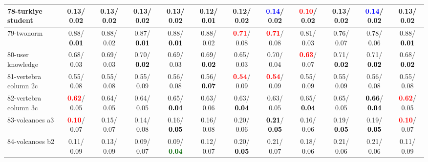 \begin{table}[h]
\begin{center}
{\begin{tabular}{lc|c|c|c|c|c|c|c|c|c|c}
78-turkiye student &   0.13/  0.02 &   0.13/  0.02 &   0.13/  0.02 &   0.13/  0.02 &   0.12/\textcolor{black}{\textbf{  0.01}} &   0.12/  0.02 & \textcolor{blue}{\textbf{  0.14}}/  0.02 & \textcolor{red}{\textbf{  0.10}}/  0.02 &   0.13/  0.02 & \textcolor{blue}{\textbf{  0.14}}/  0.02 &   0.13/  0.02 \\ \hline
79-twonorm &   0.88/\textcolor{black}{\textbf{  0.01}} &   0.88/  0.02 &   0.87/\textcolor{black}{\textbf{  0.01}} &   0.88/\textcolor{black}{\textbf{  0.01}} &   0.88/  0.02 & \textcolor{red}{\textbf{  0.71}}/  0.08 & \textcolor{red}{\textbf{  0.71}}/  0.08 &   0.81/  0.03 &   0.76/  0.07 &   0.78/  0.06 &   0.88/\textcolor{black}{\textbf{  0.01}} \\
80-user knowledge &   0.68/  0.03 &   0.69/  0.03 &   0.70/\textcolor{black}{\textbf{  0.02}} &   0.69/  0.03 &   0.69/\textcolor{black}{\textbf{  0.02}} &   0.65/  0.03 &   0.70/  0.04 & \textcolor{red}{\textbf{  0.63}}/  0.07 &   0.71/\textcolor{black}{\textbf{  0.02}} &   0.71/\textcolor{black}{\textbf{  0.02}} &   0.68/\textcolor{black}{\textbf{  0.02}} \\
81-vertebra column 2c &   0.55/  0.08 &   0.55/  0.08 &   0.55/  0.09 &   0.56/  0.08 &   0.56/\textcolor{black}{\textbf{  0.07}} & \textcolor{red}{\textbf{  0.54}}/  0.09 & \textcolor{red}{\textbf{  0.54}}/  0.09 &   0.55/  0.09 &   0.55/  0.09 &   0.56/  0.08 &   0.55/  0.08 \\
82-vertebra column 3c & \textcolor{red}{\textbf{  0.62}}/  0.05 &   0.64/  0.05 &   0.64/  0.05 &   0.65/\textcolor{black}{\textbf{  0.04}} &   0.63/  0.06 &   0.63/\textcolor{black}{\textbf{  0.04}} &   0.63/  0.05 &   0.65/\textcolor{black}{\textbf{  0.04}} &   0.65/  0.05 & \textcolor{black}{\textbf{  0.66}}/\textcolor{black}{\textbf{  0.04}} & \textcolor{red}{\textbf{  0.62}}/  0.05 \\
83-volcanoes a3 & \textcolor{red}{\textbf{  0.10}}/  0.07 &   0.15/  0.07 &   0.14/  0.08 &   0.16/\textcolor{black}{\textbf{  0.05}} &   0.16/  0.08 &   0.20/  0.06 & \textcolor{black}{\textbf{  0.21}}/\textcolor{black}{\textbf{  0.05}} &   0.16/  0.06 &   0.19/\textcolor{black}{\textbf{  0.05}} &   0.19/\textcolor{black}{\textbf{  0.05}} & \textcolor{red}{\textbf{  0.10}}/  0.07 \\
84-volcanoes b2 &   0.11/  0.09 &   0.13/  0.09 &   0.09/  0.07 &   0.09/\textcolor{darkgreen}{\textbf{  0.04}} &   0.12/  0.07 &   0.20/\textcolor{black}{\textbf{  0.05}} &   0.21/  0.07 &   0.18/  0.06 &   0.21/  0.06 &   0.21/  0.06 &   0.11/  0.09 \\

\end{tabular}}
\end{center}
\end{table}
